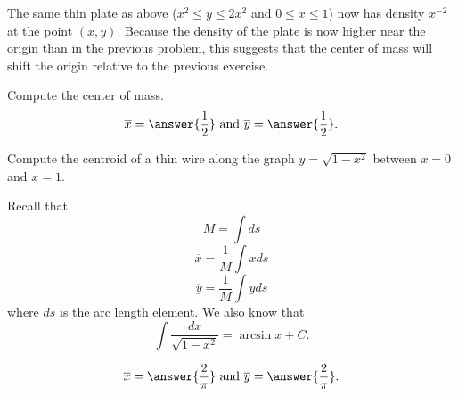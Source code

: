 \documentclass{ximera}
\begin{document}
\begin{exercise}
The same thin plate as above ($x^2 \leq y \leq 2x^2$ and $0 \leq x \leq 1$) now has density $x^{-2}$ at the point $(x,y)$.  Because the density of the plate is now higher near the origin than in the previous problem, this suggests that the center of mass will shift  the origin relative to the previous exercise.

Compute the center of mass.
\[ \overline{x} = \answer{\frac{1}{2}} \text{ and } \overline{y} = \answer{\frac{1}{2}}. \]
\end{exercise}

\begin{exercise}
Compute the centroid of a thin wire along the graph $y = \sqrt{1-x^2}$ between $x = 0$ and $x=1$. 
\begin{hint}
Recall that 
\[ M = \int ds \]
\[ \overline{x} = \frac{1}{M} \int x ds \]
\[ \overline{y} = \frac{1}{M} \int y ds \]
where $ds$ is the arc length element. We also know that
\[ \int \frac{dx}{\sqrt{1-x^2}} = \arcsin x + C. \]
\end{hint}
\[ \overline{x} = \answer{\frac{2}{\pi}} \text{ and } \overline{y} = \answer{\frac{2}{\pi}}. \]
\end{exercise}
\end{document}
